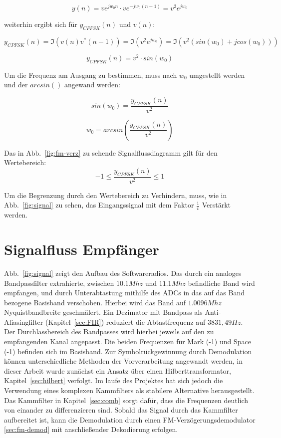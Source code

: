 \documentclass{article}
\begin{document}
$$
y(n) = v e^{j w_0 n} \cdot v e^{-j w_0 (n-1)} = v^2 e^{j w_0}
$$

weiterhin ergibt sich für $y_{CPFSK}(n)$ und $v(n)$:

$$
y_{CPFSK}(n) = \Im(v(n) v^\ast(n-1)) = \Im( v^2 e^{j w_0}) = \Im(v^2 (sin(w_0) + j cos(w_0)))
$$

$$
y_{CPFSK}(n) = v^2 \cdot sin(w_0)
$$

Um die Frequenz am Ausgang zu bestimmen, muss nach $w_0$ umgestellt werden und der $arcsin()$ angewand werden:

$$
sin(w_0) = \frac{y_{CPFSK}(n)}{v^2}
$$

$$
w_0 = arcsin(\frac{y_{CPFSK}(n)}{v^2})
$$

Das in Abb.~\ref{fig:fm-verz} zu sehende Signalflussdiagramm gilt für den Wertebereich:
$$
-1 \leq  \frac{y_{CPFSK}(n)}{v^2} \leq 1
$$

Um die Begrenzung durch den Wertebereich zu Verhindern, muss, wie in Abb.~\ref{fig:signal} zu sehen, 
das Eingangssignal mit dem Faktor $\frac{1}{v}$ Verstärkt werden.

\section{Signalfluss Empfänger}

Abb.~\ref{fig:signal} zeigt den Aufbau des Softwareradios. Das durch ein analoges Bandpassfilter extrahierte, zwischen $10.1Mhz$ und $11.1Mhz$ befindliche Band wird empfangen, und durch Unterabtastung mithilfe des ADCs in das auf das Band bezogene Basisband verschoben.
Hierbei wird das Band auf $1.0096Mhz$ Nyquistbandbreite geschmälert. Ein Dezimator mit Bandpass als Anti-Aliasingfilter (Kapitel~\ref{sec:FIR}) reduziert die Abtastfrequenz auf $3831,49Hz$. Der Durchlassbereich des Bandpasses wird hierbei jeweils auf den zu empfangenden Kanal angepasst. Die beiden Frequenzen für Mark (-1) und Space (-1) befinden sich im Basisband. Zur Symbolrückgewinnung durch Demodulation können unterschiedliche Methoden der Vorverarbeitung angewandt werden, in dieser Arbeit wurde zunächst ein Ansatz über einen Hilberttransformator, Kapitel~\ref{sec:hilbert} verfolgt. Im laufe des Projektes hat sich jedoch die Verwendung eines komplexen Kammfilters
als stabilere Alternative herausgestellt. Das Kammfilter in Kapitel~\ref{sec:comb} sorgt dafür, dass die Frequenzen deutlich von einander zu differenzieren sind. Sobald das Signal durch das Kammfilter
aufbereitet ist, kann die Demodulation durch einen FM-Verzögerungsdemodulator \ref{sec:fm-demod} mit anschließender Dekodierung erfolgen.
\end{document}
